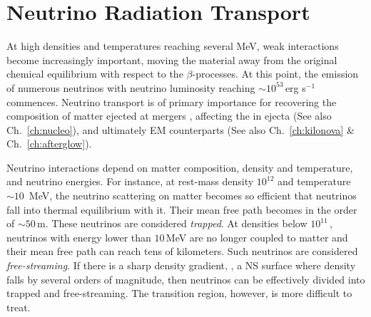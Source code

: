 
\section{Neutrino Radiation Transport}\label{sec:nr_methods:neut}



At high densities and temperatures reaching several MeV, weak interactions become 
increasingly important, moving the material away from the original chemical equilibrium 
with respect to the $\beta$-processes.
At this point, the emission of numerous neutrinos with neutrino luminosity 
reaching $\sim10^{53}\,$erg s$^{-1}$ commences. 
%
Neutrino transport is of primary importance for recovering the composition of matter  
ejected at mergers  \citep{Wanajo:2014wha,Sekiguchi:2015dma,Foucart:2015vpa,Foucart:2015gaa},
affecting the \nuc{} in ejecta \citep{Wanajo:2014wha,Goriely:2015fqa} 
(See also Ch.~\ref{ch:nucleo}), 
and ultimately \ac{EM} counterparts 
\citep{Metzger:2014ila,Lippuner:2015gwa} (See also Ch.~\ref{ch:kilonova} \& Ch.~\ref{ch:afterglow}).

Neutrino interactions depend on matter composition, density and temperature, 
and neutrino energies. For instance, at rest-mass density $10^{12}$\gcm{} 
and temperature $\sim10$~MeV, the neutrino scattering on matter becomes so efficient 
that neutrinos fall into thermal equilibrium with it. Their mean free path 
becomes in the order of $\sim 50\,$m. These neutrinos are considered \textit{trapped}.
%
At densities below $10^{11}\,$\gcm, neutrinos with energy lower than $10\,$MeV 
are no longer coupled to matter and their mean free path can reach tens 
of kilometers. Such neutrinos are considered \textit{free-streaming}.
%
If there is a sharp density gradient, \eg, a \ac{NS} surface 
where density falls by several orders of magnitude, then neutrinos can be effectively 
divided into trapped and free-streaming. The transition region, however, 
is more difficult to treat.


